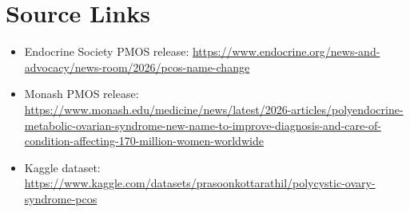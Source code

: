 \documentclass[11pt]{article}
\begin{document}
\section*{Source Links}
\begin{itemize}
\item Endocrine Society PMOS release: \url{https://www.endocrine.org/news-and-advocacy/news-room/2026/pcos-name-change}
\item Monash PMOS release: \url{https://www.monash.edu/medicine/news/latest/2026-articles/polyendocrine-metabolic-ovarian-syndrome-new-name-to-improve-diagnosis-and-care-of-condition-affecting-170-million-women-worldwide}
\item Kaggle dataset: \url{https://www.kaggle.com/datasets/prasoonkottarathil/polycystic-ovary-syndrome-pcos}
\end{itemize}
\end{document}

